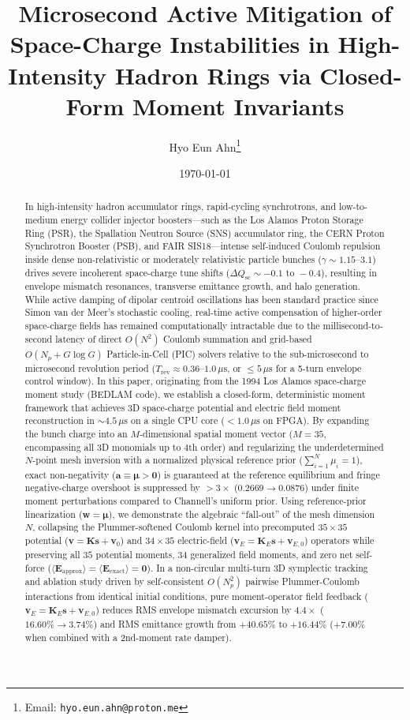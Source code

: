 \documentclass[11pt,a4paper]{article}
\title{\textbf{Microsecond Active Mitigation of Space-Charge Instabilities in High-Intensity Hadron Rings via Closed-Form Moment Invariants}}
\author{Hyo Eun Ahn\thanks{Email: \texttt{hyo.eun.ahn@proton.me}}}
\date{\today}
\begin{document}
\maketitle

\begin{abstract}
In high-intensity hadron accumulator rings, rapid-cycling synchrotrons, and low-to-medium energy collider injector boosters---such as the Los Alamos Proton Storage Ring (PSR), the Spallation Neutron Source (SNS) accumulator ring, the CERN Proton Synchrotron Booster (PSB), and FAIR SIS18---intense self-induced Coulomb repulsion inside dense non-relativistic or moderately relativistic particle bunches ($\gamma \sim 1.15\text{--}3.1$) drives severe incoherent space-charge tune shifts ($\Delta Q_{\mathrm{sc}} \sim -0.1 \text{ to } -0.4$), resulting in envelope mismatch resonances, transverse emittance growth, and halo generation. While active damping of dipolar centroid oscillations has been standard practice since Simon van der Meer's stochastic cooling, real-time active compensation of higher-order space-charge fields has remained computationally intractable due to the millisecond-to-second latency of direct $O(N^2)$ Coulomb summation and grid-based $O(N_p + G \log G)$ Particle-in-Cell (PIC) solvers relative to the sub-microsecond to microsecond revolution period ($T_{\mathrm{rev}} \approx 0.36\text{--}1.0\,\mu\mathrm{s}$, or $\le 5\,\mu\mathrm{s}$ for a 5-turn envelope control window). In this paper, originating from the 1994 Los Alamos space-charge moment study (BEDLAM code), we establish a closed-form, deterministic moment framework that achieves 3D space-charge potential and electric field moment reconstruction in $\sim 4.5\,\mu\mathrm{s}$ on a single CPU core ($< 1.0\,\mu\mathrm{s}$ on FPGA). By expanding the bunch charge into an $M$-dimensional spatial moment vector ($M=35$, encompassing all 3D monomials up to 4th order) and regularizing the underdetermined $N$-point mesh inversion with a normalized physical reference prior ($\sum_{i=1}^N \mu_i = 1$), exact non-negativity ($\bm{a} \equiv \bm{\mu} > \bm{0}$) is guaranteed at the reference equilibrium and fringe negative-charge overshoot is suppressed by $>3\times$ ($0.2669 \to 0.0876$) under finite moment perturbations compared to Channell's uniform prior. Using reference-prior linearization ($\bm{w} = \bm{\mu}$), we demonstrate the algebraic ``fall-out'' of the mesh dimension $N$, collapsing the Plummer-softened Coulomb kernel into precomputed $35 \times 35$ potential ($\bm{v} = \bm{K}\bm{s} + \bm{v}_0$) and $34 \times 35$ electric-field ($\bm{v}_E = \bm{K}_E\bm{s} + \bm{v}_{E,0}$) operators while preserving all $35$ potential moments, $34$ generalized field moments, and zero net self-force ($\langle \bm{E}_{\mathrm{approx}} \rangle = \langle \bm{E}_{\mathrm{exact}} \rangle = \bm{0}$). In a non-circular multi-turn 3D symplectic tracking and ablation study driven by self-consistent $O(N_p^2)$ pairwise Plummer-Coulomb interactions from identical initial conditions, pure moment-operator field feedback ($\bm{v}_E = \bm{K}_E\bm{s} + \bm{v}_{E,0}$) reduces RMS envelope mismatch excursion by $4.4\times$ ($16.60\% \to 3.74\%$) and RMS emittance growth from $+40.65\%$ to $+16.44\%$ ($+7.00\%$ when combined with a 2nd-moment rate damper).

\end{abstract}
\end{document}
